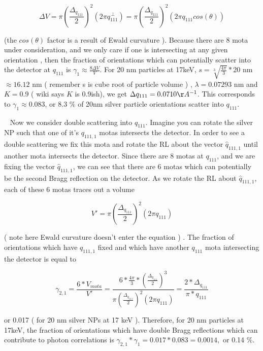 \documentclass[fontsize=15pt, paper=a4]{amsart}
\begin{document}
\begin{equation}
\Delta V =    \pi \left( \frac{\Delta_{q_{111}}} { 2} \right ) ^ {2} \left (2\pi q_{111}^{\,\perp} \right )  =   \pi \left( \frac{\Delta_{q_{111}}} { 2} \right ) ^ {2} \left (2\pi q_{111} cos(\theta )\right ) 
\end{equation}

(the $cos(\theta)$ factor is a result of Ewald curvature ). Because there are 8 mota under consideration, and we only care if one is intersecting at any given orientation , then the fraction of orientations which can potentially scatter into the detector at $q_{111}$ is $ \gamma_{1} \approx \frac{8 \Delta V}{V}$. For 20 nm particles at 17keV, $s = \sqrt[3]{\frac{4\pi}{3}} * 20$ nm $\approx 16.12$ nm ( remember s is cube root of particle volume ) , $\lambda = 0.07293$ nm and $K = 0.9$ ( wiki says $K$ is  0.9ish), we get $\Delta q_{111} = 0.0710 \AA^{-1}$. This corresponds to $\gamma_{1} \approx  0.083 $, or 8.3 \% of 20nm silver particle orientations scatter into $q_{111} $. 

\ \newline
Now we consider double scattering into $q_{111}$. Imagine you can rotate the silver NP such that one of it's $q_{111,1}$ motas intersects the detector. In order to see a double scattering we fix this mota and rotate the RL about the vector $\hat{q}_{111,1}$ until another mota intersects the detector. Since there are 8 motas at $q_{111}$, and we are fixing the vector $\hat{q}_{111,1}$, we can see that there are 6 motas which can potentially be the second Bragg reflection on the detector. As we rotate the RL about $\hat{q}_{111,1}$, each of these 6 motas traces out a volume

\begin{equation}
 V' = \pi \left( \frac{\Delta_{q_{111}}} { 2} \right ) ^ {2} \left (2\pi q_{111} \right ) 
\end{equation}

( note here Ewald curvature doesn't enter the equation ) . The fraction of orientations which have $q_{111,1}$ fixed and which have another $q_{111}$ mota intersecting the detector is equal to 

\begin{equation}
\gamma_{2,1} = \frac{ 6 * V_{mota}}{V'} = \frac{6 * \frac{4\pi}{3} * (\frac{\Delta_{q_{111}} } {2} )^{3}}{ \pi \left( \frac{\Delta_{q_{111}}} { 2} \right ) ^ {2} \left (2\pi q_{111} \right )} = \frac{2*\Delta_{q_{111}}}{\pi * q_{111}}
\end{equation}

 or 0.017 ( for 20 nm silver NPs at 17 keV ). Therefore, for 20 nm particles at 17keV, the fraction of orientations which have double Bragg reflections which can contribute to photon correlations is $ \gamma_{2,1} * \gamma_{1} = 0.017 * 0.083 = 0.0014,$ or 0.14 \%.
\end{document}
